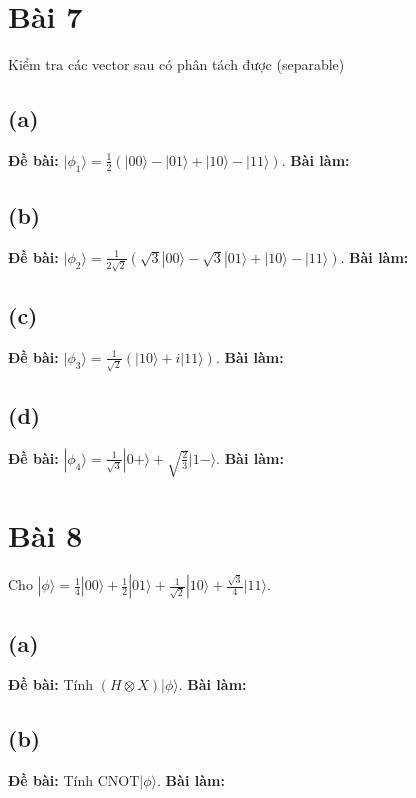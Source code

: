 \section{Bài 7}
Kiểm tra các vector sau có phân tách được (separable)

\subsection{(a)}
\textbf{Đề bài:} $|\phi_{1}\rangle=\frac{1}{2}(|00\rangle-|01\rangle+|10\rangle-|11\rangle).$
\textbf{Bài làm:}

\subsection{(b)}
\textbf{Đề bài:} $|\phi_{2}\rangle=\frac{1}{2\sqrt{2}}(\sqrt{3}|00\rangle-\sqrt{3}|01\rangle+|10\rangle-|11\rangle)$.
\textbf{Bài làm:}

\subsection{(c)}
\textbf{Đề bài:} $|\phi_{3}\rangle=\frac{1}{\sqrt{2}}(|10\rangle+i|11\rangle)$.
\textbf{Bài làm:}

\subsection{(d)}
\textbf{Đề bài:} $|\phi_{4}\rangle=\frac{1}{\sqrt{3}}|0+\rangle+\sqrt{\frac{2}{3}}|1-\rangle$.
\textbf{Bài làm:}

\section{Bài 8}
Cho $|\phi\rangle=\frac{1}{4}|00\rangle+\frac{1}{2}|01\rangle+\frac{1}{\sqrt{2}}|10\rangle+\frac{\sqrt{3}}{4}|11\rangle$.

\subsection{(a)}
\textbf{Đề bài:} Tính $(H\otimes X)|\phi\rangle$.
\textbf{Bài làm:}

\subsection{(b)}
\textbf{Đề bài:} Tính $\mathrm{CNOT}|\phi\rangle$.
\textbf{Bài làm:}